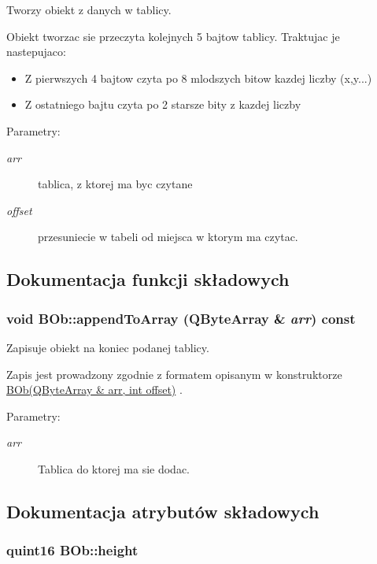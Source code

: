 Tworzy obiekt z danych w tablicy. 

Obiekt tworzac sie przeczyta kolejnych 5 bajtow tablicy. Traktujac je nastepujaco:

\begin{itemize}
\item Z pierwszych 4 bajtow czyta po 8 mlodszych bitow kazdej liczby (x,y...) \item Z ostatniego bajtu czyta po 2 starsze bity z kazdej liczby\end{itemize}
\begin{Desc}
\item[Parametry:]
\begin{description}
\item[{\em arr}]tablica, z ktorej ma byc czytane \item[{\em offset}]przesuniecie w tabeli od miejsca w ktorym ma czytac. \end{description}
\end{Desc}


\subsection{Dokumentacja funkcji składowych}
\hypertarget{class_b_ob_11fbd7ab4c8dda600232b40b02a20cbe}{
\subsubsection[{appendToArray}]{\setlength{\rightskip}{0pt plus 5cm}void BOb::appendToArray (QByteArray \& {\em arr}) const}}
\label{class_b_ob_11fbd7ab4c8dda600232b40b02a20cbe}


Zapisuje obiekt na koniec podanej tablicy. 

Zapis jest prowadzony zgodnie z formatem opisanym w konstruktorze \hyperlink{class_b_ob_b71739ff83cf58d15b42f26274c583d1}{BOb(QByteArray \& arr, int offset)} .

\begin{Desc}
\item[Parametry:]
\begin{description}
\item[{\em arr}]Tablica do ktorej ma sie dodac. \end{description}
\end{Desc}


\subsection{Dokumentacja atrybutów składowych}
\hypertarget{class_b_ob_c406681bc6029dc6e41aa53791e9f210}{
\subsubsection[{height}]{\setlength{\rightskip}{0pt plus 5cm}quint16 {\bf BOb::height}}}
\label{class_b_ob_c406681bc6029dc6e41aa53791e9f210}


